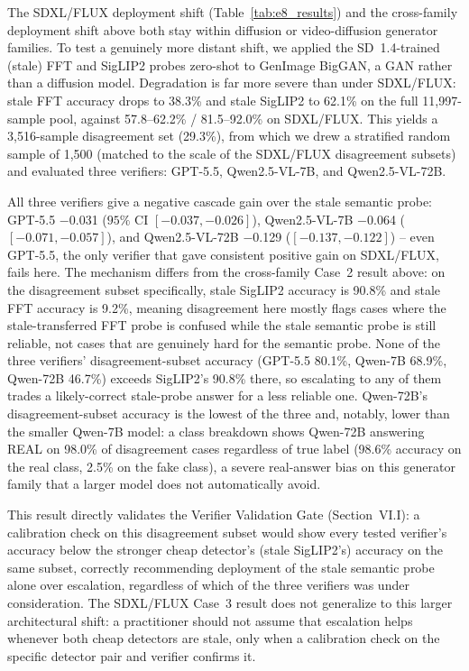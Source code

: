 \documentclass{ieeeaccess}
\begin{document}
The SDXL/FLUX deployment shift (Table~\ref{tab:e8_results}) and the cross-family
deployment shift above both stay within diffusion or video-diffusion generator
families. To test a genuinely more distant shift, we applied the SD~1.4-trained
(stale) FFT and SigLIP2 probes zero-shot to GenImage BigGAN, a GAN rather than a
diffusion model. Degradation is far more severe than under SDXL/FLUX: stale FFT
accuracy drops to 38.3\% and stale SigLIP2 to 62.1\% on the full 11{,}997-sample
pool, against 57.8--62.2\% / 81.5--92.0\% on SDXL/FLUX. This yields a 3{,}516-sample
disagreement set (29.3\%), from which we drew a stratified random sample of 1{,}500
(matched to the scale of the SDXL/FLUX disagreement subsets) and evaluated three
verifiers: GPT-5.5, Qwen2.5-VL-7B, and Qwen2.5-VL-72B.

All three verifiers give a negative cascade gain over the stale semantic probe: GPT-5.5
$-$0.031 ($95\%$ CI $[-0.037, -0.026]$), Qwen2.5-VL-7B $-$0.064 ($[-0.071, -0.057]$), and
Qwen2.5-VL-72B $-$0.129 ($[-0.137, -0.122]$) -- even GPT-5.5, the only verifier that gave
consistent positive gain on SDXL/FLUX, fails here. The mechanism differs from the
cross-family Case~2 result above: on the disagreement subset specifically, stale
SigLIP2 accuracy is 90.8\% and stale FFT accuracy is 9.2\%, meaning disagreement here
mostly flags cases where the stale-transferred FFT probe is confused while the stale
semantic probe is still reliable, not cases that are genuinely hard for the semantic
probe. None of the three verifiers' disagreement-subset accuracy (GPT-5.5 80.1\%,
Qwen-7B 68.9\%, Qwen-72B 46.7\%) exceeds SigLIP2's 90.8\% there, so escalating to any of
them trades a likely-correct stale-probe answer for a less reliable one. Qwen-72B's
disagreement-subset accuracy is the lowest of the three and, notably, lower than the
smaller Qwen-7B model: a class breakdown shows Qwen-72B answering REAL on 98.0\% of
disagreement cases regardless of true label (98.6\% accuracy on the real class, 2.5\%
on the fake class), a severe real-answer bias on this generator family that a larger
model does not automatically avoid.

This result directly validates the Verifier Validation Gate (Section~VI.I): a
calibration check on this disagreement subset would show every tested verifier's
accuracy below the stronger cheap detector's (stale SigLIP2's) accuracy on the same
subset, correctly recommending deployment of the stale semantic probe alone over
escalation, regardless of which of the three verifiers was under consideration. The
SDXL/FLUX Case~3 result does not generalize to this larger architectural shift: a
practitioner should not assume that escalation helps whenever both cheap detectors are
stale, only when a calibration check on the specific detector pair and verifier
confirms it.
\end{document}
